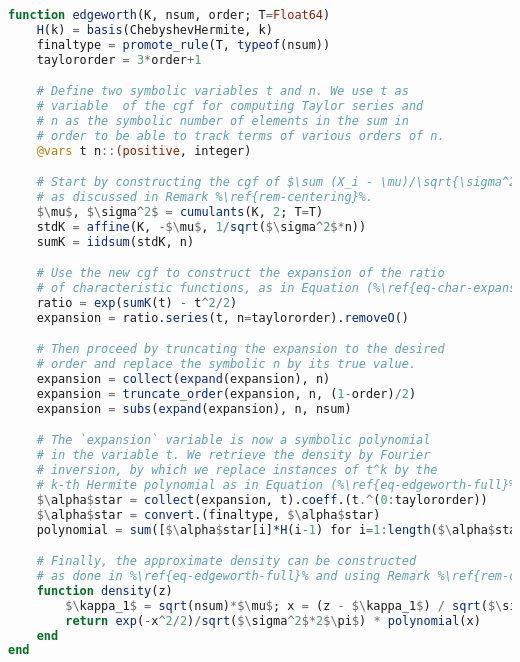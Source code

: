 \begin{lstlisting}[language=Julia, mathescape, escapechar=\%, caption={Symbolic implementation of the Edgeworth expansion}, label={lst-edgeworth}]
function edgeworth(K, nsum, order; T=Float64)
    H(k) = basis(ChebyshevHermite, k)
    finaltype = promote_rule(T, typeof(nsum))
    taylororder = 3*order+1

    # Define two symbolic variables t and n. We use t as
    # variable  of the cgf for computing Taylor series and
    # n as the symbolic number of elements in the sum in
    # order to be able to track terms of various orders of n.
    @vars t n::(positive, integer)

    # Start by constructing the cgf of $\sum (X_i - \mu)/\sqrt{\sigma^2 n}$,
    # as discussed in Remark %\ref{rem-centering}%.
    $\mu$, $\sigma^2$ = cumulants(K, 2; T=T)
    stdK = affine(K, -$\mu$, 1/sqrt($\sigma^2$*n))
    sumK = iidsum(stdK, n)

    # Use the new cgf to construct the expansion of the ratio 
    # of characteristic functions, as in Equation (%\ref{eq-char-expansion}%).
    ratio = exp(sumK(t) - t^2/2)
    expansion = ratio.series(t, n=taylororder).removeO()

    # Then proceed by truncating the expansion to the desired 
    # order and replace the symbolic n by its true value.
    expansion = collect(expand(expansion), n)
    expansion = truncate_order(expansion, n, (1-order)/2)
    expansion = subs(expand(expansion), n, nsum)

    # The `expansion` variable is now a symbolic polynomial 
    # in the variable t. We retrieve the density by Fourier 
    # inversion, by which we replace instances of t^k by the 
    # k-th Hermite polynomial as in Equation (%\ref{eq-edgeworth-full}%).
    $\alpha$star = collect(expansion, t).coeff.(t.^(0:taylororder))
    $\alpha$star = convert.(finaltype, $\alpha$star)
    polynomial = sum([$\alpha$star[i]*H(i-1) for i=1:length($\alpha$star)])

    # Finally, the approximate density can be constructed
    # as done in %\ref{eq-edgeworth-full}% and using Remark %\ref{rem-centering}%.
    function density(z)
        $\kappa_1$ = sqrt(nsum)*$\mu$; x = (z - $\kappa_1$) / sqrt($\sigma^2$)
        return exp(-x^2/2)/sqrt($\sigma^2$*2$\pi$) * polynomial(x)
    end
end
\end{lstlisting}